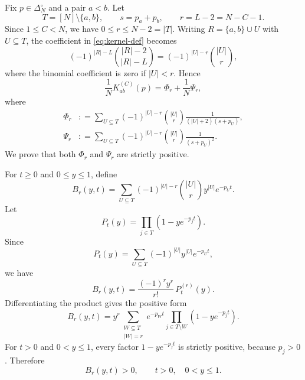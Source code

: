 \documentclass[11pt]{article}
\theoremstyle{remark}
\newcommand{\card}[1]{\lvert #1\rvert}
\begin{document}
Fix $p\in\Delta_N^\circ$ and a pair $a<b$.  Let
\[
        T=[N]\setminus\{a,b\},
        \qquad
        s=p_a+p_b,
        \qquad
        r=L-2=N-C-1.
\]
Since $1\le C<N$, we have $0\le r\le N-2=\card T$.  Writing
$R=\{a,b\}\cup U$ with $U\subseteq T$, the coefficient in
\eqref{eq:kernel-def} becomes
\[
        (-1)^{\card R-L}\binom{\card R-2}{\card R-L}
        =
        (-1)^{\card U-r}\binom{\card U}{r},
\]
where the binomial coefficient is zero if $\card U<r$.  Hence
\begin{equation}\label{eq:K-Phi-Psi}
        \frac1N K_{ab}^{(C)}(p)=\Phi_r+\frac1N\Psi_r,
\end{equation}
where
\begin{align}
        \Phi_r
        &: =
        \sum_{U\subseteq T}
        (-1)^{\card U-r}\binom{\card U}{r}
        \frac{1}{(\card U+2)(s+p_U)},
        \label{eq:Phi-def}
        \\
        \Psi_r
        &: =
        \sum_{U\subseteq T}
        (-1)^{\card U-r}\binom{\card U}{r}
        \frac{1}{(s+p_U)^2}.
        \label{eq:Psi-def}
\end{align}
We prove that both $\Phi_r$ and $\Psi_r$ are strictly positive.

For $t\ge0$ and $0\le y\le1$, define
\begin{equation}\label{eq:B-def}
        B_r(y,t)
        =
        \sum_{U\subseteq T}
        (-1)^{\card U-r}\binom{\card U}{r}
        y^{\card U}e^{-p_Ut}.
\end{equation}
Let
\[
        P_t(y)=\prod_{j\in T}(1-y e^{-p_jt}).
\]
Since
\[
        P_t(y)=\sum_{U\subseteq T}(-1)^{\card U}y^{\card U}e^{-p_Ut},
\]
we have
\begin{equation}\label{eq:B-derivative}
        B_r(y,t)=\frac{(-1)^r y^r}{r!}\,P_t^{(r)}(y).
\end{equation}
Differentiating the product gives the positive form
\begin{equation}\label{eq:B-positive-form}
        B_r(y,t)
        =
        y^r
        \sum_{\substack{W\subseteq T\\ \card W=r}}
        e^{-p_Wt}
        \prod_{j\in T\setminus W}(1-y e^{-p_jt}).
\end{equation}
For $t>0$ and $0<y\le1$, every factor
$1-y e^{-p_jt}$ is strictly positive, because $p_j>0$.  Therefore
\begin{equation}\label{eq:B-positive}
        B_r(y,t)>0,
        \qquad t>0,
        \quad 0<y\le1.
\end{equation}
\end{document}
